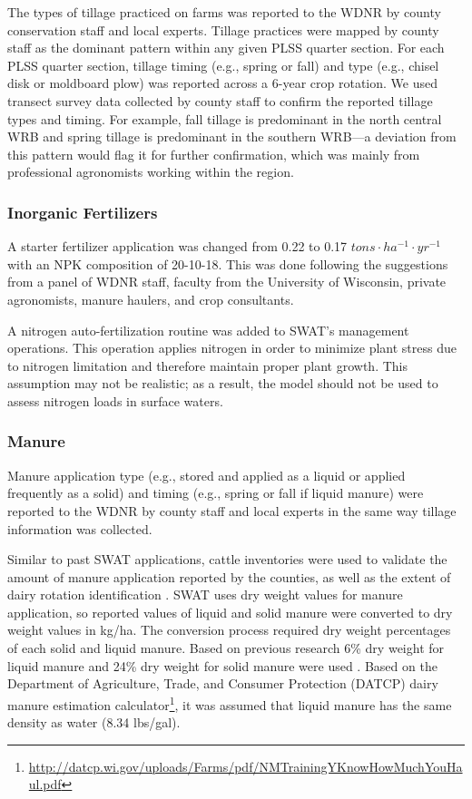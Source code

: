 The types of tillage practiced on farms was reported to the WDNR by county conservation staff and local experts. Tillage practices were mapped by county staff as the dominant pattern within any given PLSS quarter section. For each PLSS quarter section, tillage timing (e.g., spring or fall) and type (e.g., chisel disk or moldboard plow) was reported across a 6-year crop rotation. We used transect survey data collected by county staff to confirm the reported tillage types and timing. For example, fall tillage is predominant in the north central WRB and spring tillage is predominant in the southern WRB---a deviation from this pattern would flag it for further confirmation, which was mainly from professional agronomists working within the region.

\subsubsection{Inorganic Fertilizers}

A starter fertilizer application was changed from 0.22 to 0.17 $tons \cdot ha^{-1} \cdot yr^{-1}$ with an NPK composition of 20-10-18. This was done following the suggestions from a panel of WDNR staff, faculty from the University of Wisconsin, private agronomists, manure haulers, and crop consultants.

A nitrogen auto-fertilization routine was added to SWAT's management operations. 
This operation applies nitrogen in order to minimize plant stress due to nitrogen limitation and therefore maintain proper plant growth. This assumption may not be realistic; as a result, the model should not be used to assess nitrogen loads in surface waters.

\subsubsection{Manure}
Manure application type (e.g., stored and applied as a liquid or applied frequently as a solid) and timing (e.g., spring or fall if liquid manure) were reported to the WDNR by county staff and local experts in the same way tillage information was collected.

Similar to past SWAT applications, cattle inventories were used to validate the amount of manure application reported by the counties, as well as the extent of dairy rotation identification \citep{baumgart_source_2005, freihoefer_mead_2007, timm_swat_2011}. SWAT uses dry weight values for manure application, so reported values of liquid and solid manure were converted to dry weight values in kg/ha. The conversion process required dry weight percentages of each solid and liquid manure. Based on previous research 6\% dry weight for liquid manure and 24\% dry weight for solid manure were used . Based on the Department of Agriculture, Trade, and Consumer Protection (DATCP) dairy manure estimation calculator\footnote{\url{http://datcp.wi.gov/uploads/Farms/pdf/NMTrainingYKnowHowMuchYouHaul.pdf}}, it was assumed that liquid manure has the same density as water (8.34 lbs/gal).


